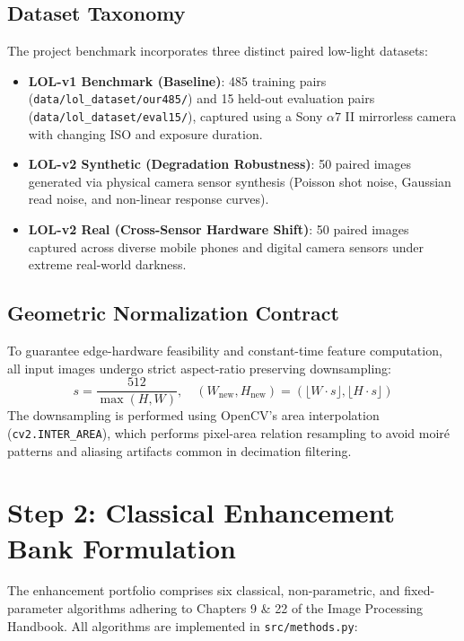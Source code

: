 \documentclass[10pt,a4paper]{article}
\begin{document}
\subsection{Dataset Taxonomy}
The project benchmark incorporates three distinct paired low-light datasets:
\begin{itemize}[leftmargin=*, nosep]
    \item \textbf{LOL-v1 Benchmark (Baseline)}: 485 training pairs (\texttt{data/lol\_dataset/our485/}) and 15 held-out evaluation pairs (\texttt{data/lol\_dataset/eval15/}), captured using a Sony $\alpha7$ II mirrorless camera with changing ISO and exposure duration.
    \item \textbf{LOL-v2 Synthetic (Degradation Robustness)}: 50 paired images generated via physical camera sensor synthesis (Poisson shot noise, Gaussian read noise, and non-linear response curves).
    \item \textbf{LOL-v2 Real (Cross-Sensor Hardware Shift)}: 50 paired images captured across diverse mobile phones and digital camera sensors under extreme real-world darkness.
\end{itemize}

\subsection{Geometric Normalization Contract}
To guarantee edge-hardware feasibility and constant-time feature computation, all input images undergo strict aspect-ratio preserving downsampling:
\begin{equation}
    s = \frac{512}{\max(H, W)}, \quad (W_{\text{new}}, H_{\text{new}}) = (\lfloor W \cdot s \rfloor, \lfloor H \cdot s \rfloor)
\end{equation}
The downsampling is performed using OpenCV's area interpolation (\texttt{cv2.INTER\_AREA}), which performs pixel-area relation resampling to avoid moir\'{e} patterns and aliasing artifacts common in decimation filtering.

\section{Step 2: Classical Enhancement Bank Formulation}

The enhancement portfolio comprises six classical, non-parametric, and fixed-parameter algorithms adhering to Chapters 9 \& 22 of the Image Processing Handbook. All algorithms are implemented in \texttt{src/methods.py}:
\end{document}
